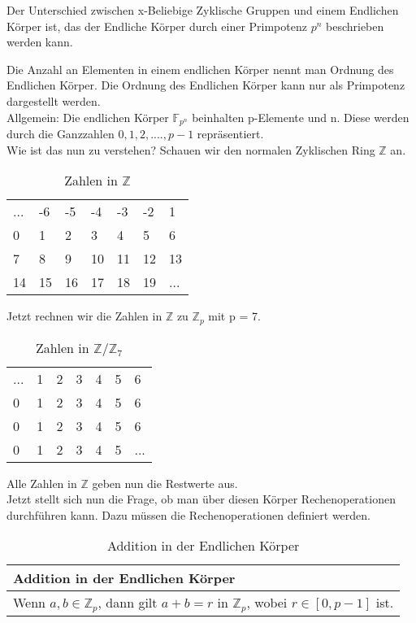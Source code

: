 Der Unterschied zwischen x-Beliebige Zyklische Gruppen und einem Endlichen Körper ist, das der Endliche Körper durch einer Primpotenz $ p^n $ beschrieben werden kann.

Die Anzahl an Elementen in einem endlichen Körper nennt man Ordnung des Endlichen Körper. Die Ordnung des Endlichen Körper kann nur als Primpotenz dargestellt werden.\\

Allgemein: Die endlichen Körper $\mathbb{F}_{p^n}$ beinhalten p-Elemente und n. Diese werden durch die Ganzzahlen ${0,1,2,....,p-1}$ repräsentiert. 
\\

Wie ist das nun zu verstehen? Schauen wir den normalen Zyklischen Ring $ \mathbb{Z}$ an.

\begin{table}[!ht]
    \begin{tabular}{lllllll}
    ... & -6 & -5 & -4 & -3 & -2 & 1  \\
    0  & 1  & 2  & 3  & 4  & 5  & 6  \\
    7  & 8  & 9  & 10 & 11 & 12 & 13 \\
    14 & 15 & 16 & 17 & 18 & 19 & ...

    \end{tabular}
    \caption{Zahlen in $\mathbb{Z}$}
\end{table}

Jetzt rechnen wir die Zahlen in $\mathbb{Z}$ zu $\mathbb{Z}_p$ mit p = 7.\\

\begin{table}[!ht]
    \begin{tabular}{lllllll}
    ...  & 1  & 2  & 3  & 4  & 5  & 6  \\
    0  & 1  & 2  & 3  & 4  & 5  & 6  \\
    0  & 1  & 2  & 3  & 4  & 5  & 6 \\
    0  & 1  & 2  & 3  & 4  & 5  & ...

    \end{tabular}
    \caption{Zahlen in $\mathbb{Z}/\mathbb{Z}_7$}
\end{table}

Alle Zahlen in $\mathbb{Z}$ geben nun die Restwerte aus.\\
Jetzt stellt sich nun die Frage, ob man über diesen Körper Rechenoperationen durchführen kann.
Dazu müssen die Rechenoperationen definiert werden.

\begin{table}[!ht]
    \centering
        \begin{tabular}{l}
            \toprule
            \textbf{Addition in der Endlichen Körper}\\
            \midrule
            Wenn $ a, b \in \mathbb{Z}_p $, dann gilt $ a+b =r$ in $ \mathbb{Z}_p $, wobei $r \in [0, p-1]$ ist.\\
           \bottomrule
        \end{tabular}
        \caption{Addition in der Endlichen Körper\cite{sec1}}
        \label{tab3}
    \end{table}

